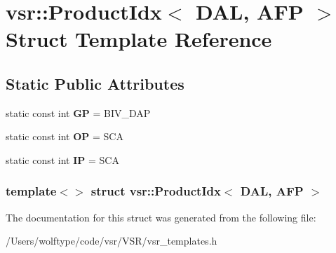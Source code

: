 \hypertarget{structvsr_1_1_product_idx_3_01_d_a_l_00_01_a_f_p_01_4}{\section{vsr\-:\-:Product\-Idx$<$ D\-A\-L, A\-F\-P $>$ Struct Template Reference}
\label{structvsr_1_1_product_idx_3_01_d_a_l_00_01_a_f_p_01_4}
}
\subsection*{Static Public Attributes}
\begin{DoxyCompactItemize}
\item 
\hypertarget{structvsr_1_1_product_idx_3_01_d_a_l_00_01_a_f_p_01_4_a1684b409fd3225120bc3148318f2e4bc}{static const int {\bfseries G\-P} = B\-I\-V\-\_\-\-D\-A\-P}\label{structvsr_1_1_product_idx_3_01_d_a_l_00_01_a_f_p_01_4_a1684b409fd3225120bc3148318f2e4bc}

\item 
\hypertarget{structvsr_1_1_product_idx_3_01_d_a_l_00_01_a_f_p_01_4_af9239e56fdacdb66424d000d3eec0575}{static const int {\bfseries O\-P} = S\-C\-A}\label{structvsr_1_1_product_idx_3_01_d_a_l_00_01_a_f_p_01_4_af9239e56fdacdb66424d000d3eec0575}

\item 
\hypertarget{structvsr_1_1_product_idx_3_01_d_a_l_00_01_a_f_p_01_4_a5312f7d254755a272810407a88c649be}{static const int {\bfseries I\-P} = S\-C\-A}\label{structvsr_1_1_product_idx_3_01_d_a_l_00_01_a_f_p_01_4_a5312f7d254755a272810407a88c649be}

\end{DoxyCompactItemize}
\subsubsection*{template$<$$>$ struct vsr\-::\-Product\-Idx$<$ D\-A\-L, A\-F\-P $>$}



The documentation for this struct was generated from the following file\-:\begin{DoxyCompactItemize}
\item 
/\-Users/wolftype/code/vsr/\-V\-S\-R/vsr\-\_\-templates.\-h\end{DoxyCompactItemize}
